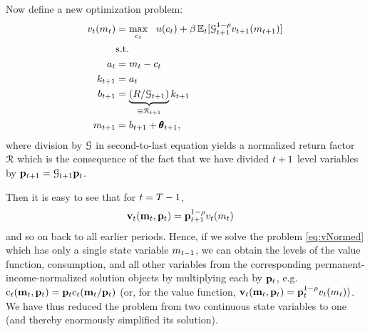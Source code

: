 Now define a new optimization problem:
  \begin{equation}\begin{gathered}\begin{aligned}
        {v}_{t}({m}_{t}) & = \max_{{c}_{t}} ~~ u({c}_{t})+{\beta}\operatorname{\mathbb{E}}_{t}[ \mathcal{G}_{t+1}^{1-\rho}{v}_{t+1}({m}_{t+1})] \label{eq:vNormed}                   \\
                                         & \text{s.t.}                                                                                 \\
        {a}_{t}                       & = {m}_{t}-{c}_{t}                                                                     \\
        {k}_{t+1}                     & = {a}_{t}                                                                                \\
        {b}_{t+1}                     & = \underbrace{\left(R/\mathcal{G}_{t+1}\right)}_{\equiv \mathcal{R}_{t+1}}{k}_{t+1} \\
        {m}_{t+1}                        & = {b}_{t+1}+\pmb{\theta}_{t+1},
      \end{aligned}\end{gathered}\end{equation}
where division by $\mathcal{G}$ in second-to-last equation yields a normalized return factor $\mathcal{R}$ which is the consequence of the fact that we have divided $t+1$ level variables by $\mathbf{p}_{t+1}=\mathcal{G}_{t+1}\mathbf{p}_{t}$.

Then it is easy to see that for $t=T-1$, 
\begin{equation*}\begin{gathered}\begin{aligned}
      {\mathbf{v}}_{t}(\mathbf{m}_{t},\mathbf{p}_{t}) & =  \mathbf{p}_{t+1}^{1-\rho}{v}_{t}({m}_{t})
    \end{aligned}\end{gathered}\end{equation*}
and so on back to all earlier periods.  Hence, if we solve the problem \eqref{eq:vNormed} which has only a single state variable $m_{t-1}$, we can obtain the levels of the value function, consumption, and all other variables from the corresponding permanent-income-normalized solution objects by multiplying each by $\mathbf{p}_{t}$, e.g.\ ${\mathrm{c}}_{t}(\mathbf{m}_{t},\mathbf{p}_{t})=\mathbf{p}_{t}\mathrm{c}_{t}(\mathbf{m}_{t}/\mathbf{p}_{t})$ (or, for the value function, ${\mathbf{v}} _{t}({\mathbf{m}}_{t},\mathbf{p}_{t}) = \mathbf{p}_{t}^{1-\rho}v_{t}({m}_{t}))$.  We have thus reduced the problem from two continuous state variables to one (and thereby enormously simplified its solution).

